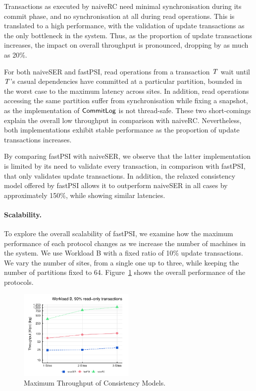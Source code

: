 Transactions as executed by naiveRC need minimal synchronisation during its commit phase, and no synchronisation at all during read operations. This is translated to a high performance, with the validation of update transactions as the only bottleneck in the system. Thus, as the proportion of update transactions increases, the impact on overall throughput is pronounced, dropping by as much as 20\%.

For both naiveSER and fastPSI, read operations from a transaction $\mathit{T}$ wait until $\mathit{T}$'s casual dependencies have committed at a particular partition, bounded in the worst case to the maximum latency across sites. In addition, read operations accessing the same partition suffer from synchronisation while fixing a snapshot, as the implementation of $\mathsf{CommitLog}$ is not thread-safe. These two short-comings explain the overall low throughput in comparison with naiveRC. Nevertheless, both implementations exhibit stable performance as the proportion of update transactions increases.

By comparing fastPSI with naiveSER, we observe that the latter implementation is limited by its need to validate every transaction, in comparison with fastPSI, that only validates update transactions. In addition, the relaxed consistency model offered by fastPSI allows it to outperform naiveSER in all cases by approximately 150\%, while showing similar latencies.

\paragraph{Scalability.} To explore the overall scalability of fastPSI, we examine how the maximum performance of each protocol changes as we increase the number of machines in the system. We use Workload B with a fixed ratio of 10\% update transactions. We vary the number of sites, from a single one up to three, while keeping the number of partitions fixed to 64. Figure~\ref{fig:site_bench} shows the overall performance of the protocols.

\begin{figure}[h]
\begin{center}
\includegraphics[width=0.5\textwidth]{figures/sites_bench.pdf}
\vspace{-1cm}
\end{center}
\caption{Maximum Throughput of Consistency Models.}
\label{fig:site_bench}
\end{figure}

